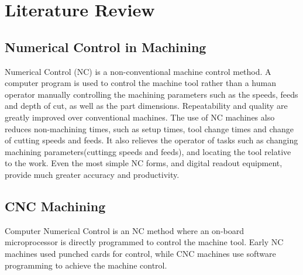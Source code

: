 \section{Literature Review}
\lhead{\leftmark}
\label{sec:review}
\subsection{Numerical Control in Machining}
Numerical Control (NC) is a non-conventional machine control method. A computer program is used to control the machine tool rather than a human operator manually controlling the machining parameters such as the speeds, feeds and depth of cut, as well as the part dimensions. Repeatability and quality are greatly improved over conventional machines. The use of NC machines also reduces non-machining times, such as setup times, tool change times and change of cutting speeds and feeds. It also relieves the operator of tasks such as changing machining parameters(cuttingg speeds and feeds), and locating the tool relative to the work. Even the most simple NC forms, and digital readout equipment, provide much greater accuracy and productivity.
\subsection{CNC Machining}
Computer Numerical Control is an NC method where an on-board microprocessor is directly programmed to control the machine tool. Early NC machines used punched cards for control, while CNC machines use software programming to achieve the machine control.
